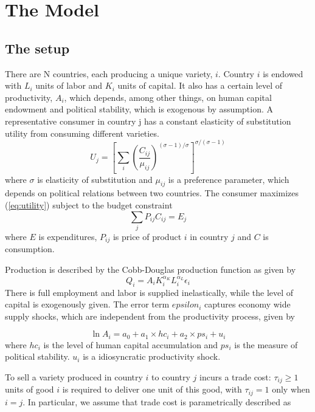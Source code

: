 \section{The Model}
\subsection{The setup}
There are N countries, each producing a unique variety, $i$. Country $i$ is endowed with $L_i$ units of labor and $K_{i}$ units of capital. It also has a certain level of productivity, $A_i$, which depends, among other things, on human capital endowment and political stability, which is exogenous by assumption.  A representative consumer in country j  has a constant elasticity of substitution utility from consuming different varieties.
\begin{equation}
\label{eq:utility}
    U_j=\left[ \sum_{i}  \left( \frac{C_{ij}}{\mu_{ij}} \right) ^{(\sigma-1)/\sigma} \right]^{\sigma/(\sigma-1)}
\end{equation}
where $\sigma$ is elasticity of substitution and $\mu_{ij}$ is a preference parameter, which depends on political relations between two countries.
The consumer maximizes (\ref{eq:utility}) subject to the budget constraint
\begin{equation}
\label{eq:budget}
\sum_{j}P_{ij}C_{ij}=E_{j}
\end{equation}
where $E$ is expenditures, $P_{ij}$ is price of product $i$ in country $j$ and $C$ is consumption. 

Production is described by the Cobb-Douglas production function as given by
\begin{equation}
\label{eq: production}
    Q_i=A_iK_i^{\alpha_K}L_i^{\alpha_L}\epsilon_{i}
\end{equation}
There is full employment and labor is supplied inelastically, while the level of capital is exogenously given. The error term $epsilon_{i}$ captures economy wide supply shocks, which are independent from the productivity process, given by

\begin{equation}
\label{eq:tfp}
    \ln A_i=a_0 +a_1\times hc_i + a_2 \times ps_i + u_i
 \end{equation}
where $hc_i$ is the level of human capital accumulation and $ps_i$ is the measure of political stability. $u_i$ is a idiosyncratic productivity shock. 
 
 
 To sell a variety produced in country $i$ to country $j$ incurs a trade cost:  $\tau_{ij}\ge 1$ units of good $i$ is required to deliver one unit of this good, with $\tau_{ij}=1$ only when $i=j$. In particular, we assume that trade cost is parametrically described as
 
